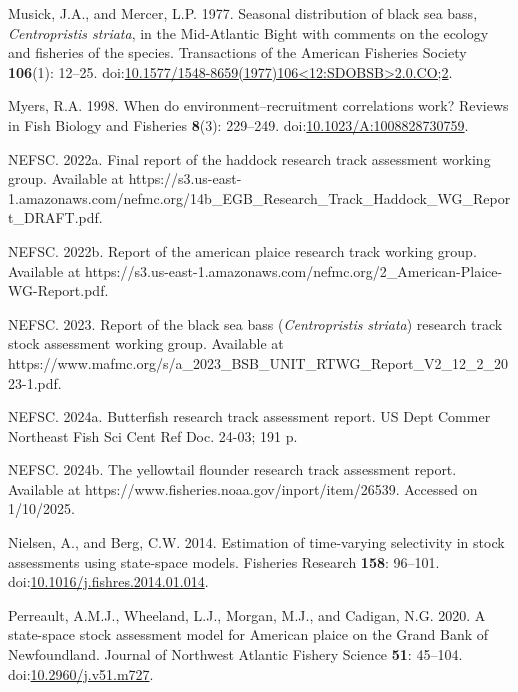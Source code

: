 \documentclass[
]{article}
\newlength{\cslhangindent}
\newlength{\cslentryspacingunit} %
\newenvironment{CSLReferences}[2] %
 {%
  \setlength{\parindent}{0pt}
  \ifodd #1
  \let\oldpar\par
  \def\par{\hangindent=\cslhangindent\oldpar}
  \fi
  \setlength{\parskip}{#2\cslentryspacingunit}
 }%
 {}
\begin{document}
\begin{CSLReferences}{1}{0}
\leavevmode{}%
Musick, J.A., and Mercer, L.P. 1977. Seasonal distribution of black sea bass, \emph{{C}entropristis striata}, in the {M}id-{A}tlantic {B}ight with comments on the ecology and fisheries of the species. Transactions of the American Fisheries Society \textbf{106}(1): 12--25. doi:\href{https://doi.org/10.1577/1548-8659(1977)106\%3C12:SDOBSB\%3E2.0.CO;2}{10.1577/1548-8659(1977)106\textless12:SDOBSB\textgreater2.0.CO;2}.

\leavevmode{}%
Myers, R.A. 1998. When do environment--recruitment correlations work? Reviews in Fish Biology and Fisheries \textbf{8}(3): 229--249. doi:\href{https://doi.org/10.1023/A:1008828730759}{10.1023/A:1008828730759}.

\leavevmode{}%
NEFSC. 2022a. Final report of the haddock research track assessment working group. {Available} at https://s3.us-east-1.amazonaws.com/nefmc.org/14b\_EGB\_Research\_Track\_Haddock\_WG\_Report\_DRAFT.pdf.

\leavevmode{}%
NEFSC. 2022b. Report of the american plaice research track working group. {Available} at https://s3.us-east-1.amazonaws.com/nefmc.org/2\_American-Plaice-WG-Report.pdf.

\leavevmode{}%
NEFSC. 2023. Report of the black sea bass (\emph{{C}entropristis} \emph{striata}) research track stock assessment working group. {Available} at https://www.mafmc.org/s/a\_2023\_BSB\_UNIT\_RTWG\_Report\_V2\_12\_2\_2023-1.pdf.

\leavevmode{}%
NEFSC. 2024a. Butterfish research track assessment report. US Dept Commer Northeast Fish Sci Cent Ref Doc. 24-03; 191 p.

\leavevmode{}%
NEFSC. 2024b. The yellowtail flounder research track assessment report. {Available} at https://www.fisheries.noaa.gov/inport/item/26539. Accessed on 1/10/2025.

\leavevmode{}%
Nielsen, A., and Berg, C.W. 2014. Estimation of time-varying selectivity in stock assessments using state-space models. Fisheries Research \textbf{158}: 96--101. doi:\href{https://doi.org/10.1016/j.fishres.2014.01.014}{10.1016/j.fishres.2014.01.014}.

\leavevmode{}%
Perreault, A.M.J., Wheeland, L.J., Morgan, M.J., and Cadigan, N.G. 2020. A state-space stock assessment model for {American} plaice on the {Grand} {Bank} of {Newfoundland}. Journal of Northwest Atlantic Fishery Science \textbf{51}: 45--104. doi:\href{https://doi.org/10.2960/j.v51.m727}{10.2960/j.v51.m727}.


\end{CSLReferences}
\end{document}
